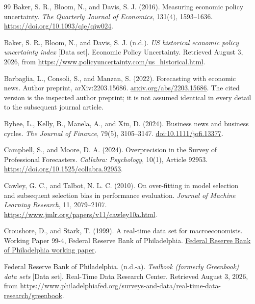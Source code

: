 \begingroup
\small
\setlength{\bibsep}{5pt}
\begin{thebibliography}{99}
Baker, S. R., Bloom, N., and Davis, S. J. (2016). Measuring economic policy uncertainty. \textit{The Quarterly Journal of Economics}, 131(4), 1593--1636.
\url{https://doi.org/10.1093/qje/qjw024}.

Baker, S. R., Bloom, N., and Davis, S. J. (n.d.). \textit{US historical economic policy uncertainty index} [Data set]. Economic Policy Uncertainty. Retrieved August 3, 2026, from
\url{https://www.policyuncertainty.com/us_historical.html}.

Barbaglia, L., Consoli, S., and Manzan, S. (2022).
Forecasting with economic news. Author preprint, arXiv:2203.15686.
\href{https://arxiv.org/abs/2203.15686}{arxiv.org/abs/2203.15686}.
The cited version is the inspected author preprint; it is not assumed identical in every detail to the subsequent journal article.

Bybee, L., Kelly, B., Manela, A., and Xiu, D. (2024).
Business news and business cycles. \textit{The Journal of Finance}, 79(5), 3105--3147.
\href{https://doi.org/10.1111/jofi.13377}{doi:10.1111/jofi.13377}.

Campbell, S., and Moore, D. A. (2024). Overprecision in the Survey of Professional Forecasters. \textit{Collabra: Psychology}, 10(1), Article 92953.
\url{https://doi.org/10.1525/collabra.92953}.

Cawley, G. C., and Talbot, N. L. C. (2010). On over-fitting in model selection and subsequent selection bias in performance evaluation. \textit{Journal of Machine Learning Research}, 11, 2079--2107.
\url{https://www.jmlr.org/papers/v11/cawley10a.html}.

Croushore, D., and Stark, T. (1999).
A real-time data set for macroeconomists. Working Paper 99-4, Federal Reserve Bank of Philadelphia.
\href{https://www.philadelphiafed.org/-/media/frbp/assets/working-papers/1999/wp99-4.pdf}{Federal Reserve Bank of Philadelphia working paper}.

Federal Reserve Bank of Philadelphia. (n.d.-a). \textit{Tealbook (formerly Greenbook) data sets} [Data set]. Real-Time Data Research Center. Retrieved August 3, 2026, from
\url{https://www.philadelphiafed.org/surveys-and-data/real-time-data-research/greenbook}.


\end{thebibliography}
